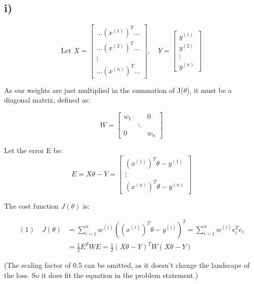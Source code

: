\begin{answer}
\subsection*{i)}
 
\[
    \text{Let } X = \begin{bmatrix} \dots (x^{(1)})^T \dots \\ \dots (x^{(2)})^T \dots \\ \vdots \\ \dots (x^{(n)})^T \dots \end{bmatrix}, \quad Y = \begin{bmatrix} y^{(1)} \\ y^{(2)} \\ \vdots \\ y^{(n)} \end{bmatrix}
\]

\vspace{0.5em}
As our weights are just multiplied in the summation of J($\theta$), it must be a diagonal matrix, defined as:

\[
    W = \begin{bmatrix} w_1 & & 0 \\ & \ddots & \\ 0 & & w_n \end{bmatrix}
    \]
    
Let the error E be:
    \[
    E = X\theta - Y = \begin{bmatrix} (x^{(1)})^T \theta - y^{(1)} \\ \vdots \\ (x^{(n)})^T \theta - y^{(n)} \end{bmatrix}
    \]
    
The cost function $J(\theta)$ is:

    \begin{align*}
        (1) \quad J(\theta) &= \sum_{i=1}^{n} w^{(i)} ((x^{(i)})^T\theta - y^{(i)})^2 = \sum_{i=1}^{n} w^{(i)} e_i^T e_i \\
        &= \frac{1}{2} E^T W E = \frac{1}{2} (X\theta - Y)^T W (X\theta - Y)
    \end{align*}
    \begin{center}
        \small{(The scaling factor of 0.5 can be omitted, as it doesn't change the landscape of the loss. So it does fit the equation in the problem statement.)}
    \end{center}
    

\end{answer}
